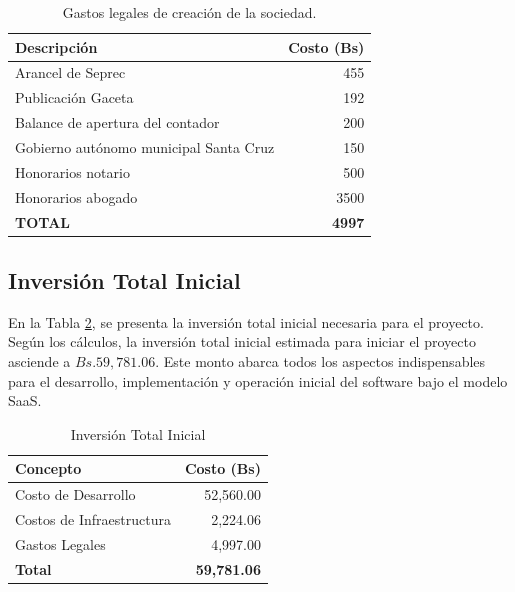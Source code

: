 \begin{table}[ht]
    \centering
    \caption{Gastos legales de creación de la sociedad.}
    \label{tab:costos_legales}
    \begin{tabularx}{\textwidth}{|X|r|} 
        \hline
        \textbf{Descripción} & \textbf{Costo (Bs)} \\ \hline
        Arancel de Seprec & 455 \\ 
        Publicación Gaceta & 192 \\ 
        Balance de apertura del contador & 200 \\ 
        Gobierno autónomo municipal Santa Cruz & 150 \\ 
        Honorarios notario & 500 \\ 
        Honorarios abogado & 3500 \\ \hline
        \textbf{TOTAL} & \textbf{4997} \\ \hline
    \end{tabularx}
\end{table}

\subsection{Inversión Total Inicial}

En la Tabla \ref{tab:inversion_total}, se presenta la inversión total inicial necesaria para el proyecto. Según los cálculos, la inversión total inicial estimada para iniciar el proyecto asciende a $Bs.59,781.06$. Este monto abarca todos los aspectos indispensables para el desarrollo, implementación y operación inicial del software bajo el modelo SaaS.

\begin{table}[ht]
    \centering
    \caption{Inversión Total Inicial}
    \label{tab:inversion_total}
    \begin{tabularx}{\textwidth}{|X|r|}
        \hline
        \textbf{Concepto} & \textbf{Costo (Bs)} \\
        \hline
        Costo de Desarrollo & 52,560.00 \\
        Costos de Infraestructura & 2,224.06 \\
        Gastos Legales & 4,997.00 \\
        \hline
        \textbf{Total} & \textbf{59,781.06} \\
        \hline
    \end{tabularx}
\end{table}

